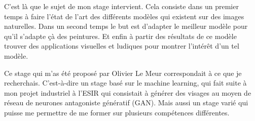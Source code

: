 \par
C'est là que le sujet de mon stage intervient. Cela consiste dans un premier temps à faire l'état de l'art des différents modèles qui existent sur des images naturelles. Dans un second temps le but est d'adapter le meilleur modèle pour qu'il s'adapte çà des peintures. Et enfin à partir des résultats de ce modèle trouver des applications visuelles et ludiques pour montrer l'intérêt d'un tel modèle.

\par 
Ce stage qui m'as été proposé par Olivier Le Meur correspondait à ce que je recherchais. C'est-à-dire un stage basé sur le machine learning, qui fait suite à mon projet industriel à l'ESIR qui consistait à générer des visages au moyen de réseau de neurones antagoniste génératif (GAN). Mais aussi un stage varié qui puisse me permettre de me former sur plusieurs compétences différentes.





